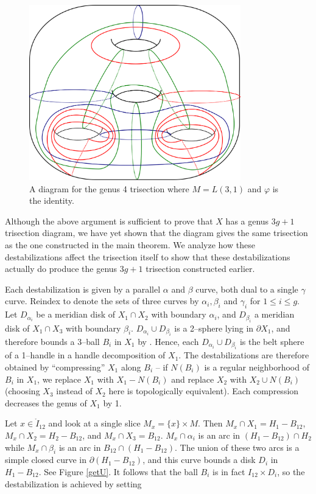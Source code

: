 \documentclass[12pt]{amsart}
\newcommand{\del}{\partial }
\theoremstyle{definition}
\theoremstyle{remark}
\begin{document}
\begin{figure}[h]
\centering
\includegraphics[height=3in]{LxS12destab.png}
\caption{A diagram for the genus 4 trisection where $M = L(3,1)$ and $\varphi$ is the identity. }
\label{ls12destab}
\end{figure}

Although the above argument is sufficient to prove that $X$ has a genus $3g+1$ trisection diagram, we have yet shown that the diagram gives the same trisection as the one constructed in the main theorem.  We analyze how these destabilizations affect the trisection itself to show that these destabilizations actually do produce the genus $3g+1$ trisection constructed earlier.  

Each destabilization is given by a parallel $\alpha$ and $\beta$ curve, both dual to a single $\gamma$ curve.  Reindex to denote the sets of three curves by $\alpha_i,\beta_i$ and $\gamma_i$ for $1 \le i \le g$.  Let $D_{\alpha_i}$ be a meridian disk of $X_1 \cap X_2$ with boundary $\alpha_i$, and $D_{\beta_i}$ a meridian disk of $X_1 \cap X_3$ with boundary $\beta_i$.  $D_{\alpha_i} \cup D_{\beta_i}$ is a 2--sphere lying in $\del X_1$, and therefore bounds a 3--ball $B_i$ in $X_1$ by \cite{LaudenbachPoenaru1}.  Hence, each $D_{\alpha_i} \cup D_{\beta_i}$ is the belt sphere of a 1--handle in a handle decomposition of $X_1$.  The destabilizations are therefore obtained by ``compressing'' $X_1$ along $B_i$ -- if $N(B_i)$ is a regular neighborhood of $B_i$ in $X_1$, we replace $X_1$ with $X_1 - N(B_i)$ and replace $X_2$ with $X_2 \cup N(B_i)$ (choosing $X_3$ instead of $X_2$ here is topologically equivalent).  Each compression decreases the genus of $X_1$ by 1.

Let $x \in \mathring I_{12}$ and look at a single slice $M_x = \{x\} \times M$.  Then $M_x \cap X_1 = H_1 - B_{12}$, $M_x \cap X_2 = H_2 - B_{12}$, and $M_x \cap X_3 = B_{12}$.  $M_x \cap \alpha_i$ is an arc in $(H_1 - B_{12}) \cap H_2$ while $M_x \cap \beta_i$ is an arc in $B_{12} \cap (H_1 - B_{12})$.  The union of these two arcs is a simple closed curve in $\del (H_1 - B_{12})$, and this curve bounds a disk $D_i$ in $H_1 - B_{12}$.  See Figure \ref{getU}.  It follows that the ball $B_i$ is in fact $I_{12} \times D_i$, so the destabilization is achieved by setting 
\end{document}
